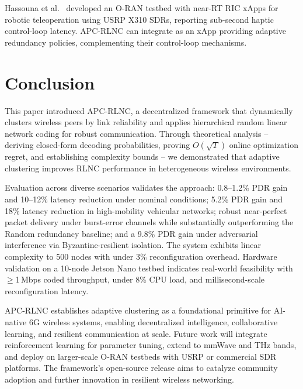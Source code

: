 \documentclass[journal]{IEEEtran}
\begin{document}
Hassouna et al.\ \cite{hassouna2025} developed an O-RAN testbed with near-RT RIC xApps for robotic teleoperation using USRP X310 SDRs, reporting sub-second haptic control-loop latency. APC-RLNC can integrate as an xApp providing adaptive redundancy policies, complementing their control-loop mechanisms.

\section{Conclusion}
\label{sec:conclusion}
This paper introduced APC-RLNC, a decentralized framework that dynamically clusters wireless peers by link reliability and applies hierarchical random linear network coding for robust communication. Through theoretical analysis -- deriving closed-form decoding probabilities, proving $O(\sqrt{T})$ online optimization regret, and establishing complexity bounds -- we demonstrated that adaptive clustering improves RLNC performance in heterogeneous wireless environments.

Evaluation across diverse scenarios validates the approach: 0.8--1.2\% PDR gain and 10--12\% latency reduction under nominal conditions; 5.2\% PDR gain and 18\% latency reduction in high-mobility vehicular networks; robust near-perfect packet delivery under burst-error channels while substantially outperforming the Random redundancy baseline; and a 9.8\% PDR gain under adversarial interference via Byzantine-resilient isolation. The system exhibits linear complexity to 500 nodes with under 3\% reconfiguration overhead. Hardware validation on a 10-node Jetson Nano testbed indicates real-world feasibility with $\geq$1\,Mbps coded throughput, under 8\% CPU load, and millisecond-scale reconfiguration latency.

APC-RLNC establishes adaptive clustering as a foundational primitive for AI-native 6G wireless systems, enabling decentralized intelligence, collaborative learning, and resilient communication at scale. Future work will integrate reinforcement learning for parameter tuning, extend to mmWave and THz bands, and deploy on larger-scale O-RAN testbeds with USRP or commercial SDR platforms. The framework's open-source release aims to catalyze community adoption and further innovation in resilient wireless networking.
\end{document}
